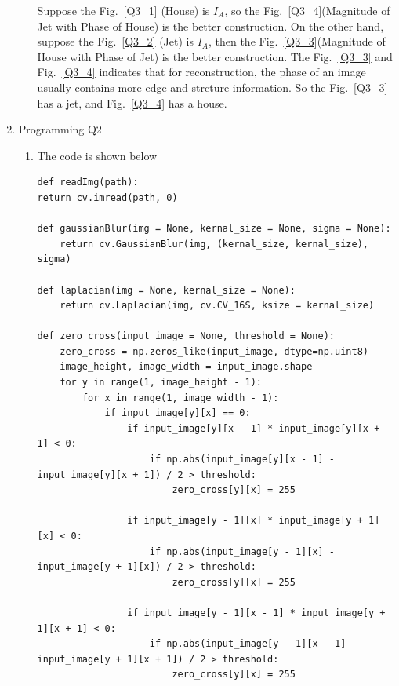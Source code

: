 \documentclass[12pt]{article}
\begin{document}
\begin{enumerate}[leftmargin=\labelsep]
\begin{enumerate}
Suppose the Fig.~\ref{Q3_1} (House) is $I_A$, so the Fig.~\ref{Q3_4}(Magnitude of Jet with Phase of House) is the better construction.
On the other hand, suppose the Fig.~\ref{Q3_2} (Jet) is $I_A$, then the Fig.~\ref{Q3_3}(Magnitude of House with Phase of Jet) is the better construction.
The Fig.~\ref{Q3_3} and Fig.~\ref{Q3_4} indicates that for reconstruction, the phase of an image usually contains more edge and strcture information. So the Fig.~\ref{Q3_3} has a jet, and Fig.~\ref{Q3_4} has a house.

\end{enumerate}


\item Programming Q2
\begin{enumerate}
    \item The code is shown below
    \begin{lstlisting}
def readImg(path):
return cv.imread(path, 0)

def gaussianBlur(img = None, kernal_size = None, sigma = None):
    return cv.GaussianBlur(img, (kernal_size, kernal_size), sigma)

def laplacian(img = None, kernal_size = None):
    return cv.Laplacian(img, cv.CV_16S, ksize = kernal_size)

def zero_cross(input_image = None, threshold = None):
    zero_cross = np.zeros_like(input_image, dtype=np.uint8)
    image_height, image_width = input_image.shape
    for y in range(1, image_height - 1):
        for x in range(1, image_width - 1):
            if input_image[y][x] == 0:
                if input_image[y][x - 1] * input_image[y][x + 1] < 0:
                    if np.abs(input_image[y][x - 1] - input_image[y][x + 1]) / 2 > threshold:
                        zero_cross[y][x] = 255

                if input_image[y - 1][x] * input_image[y + 1][x] < 0:
                    if np.abs(input_image[y - 1][x] - input_image[y + 1][x]) / 2 > threshold:
                        zero_cross[y][x] = 255

                if input_image[y - 1][x - 1] * input_image[y + 1][x + 1] < 0:
                    if np.abs(input_image[y - 1][x - 1] - input_image[y + 1][x + 1]) / 2 > threshold:
                        zero_cross[y][x] = 255


\end{lstlisting}
\end{enumerate}
\end{enumerate}
\end{document}
